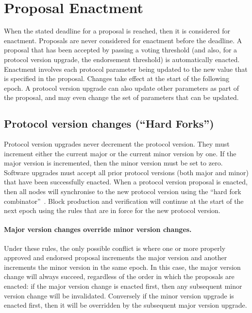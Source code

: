\newpage
\section{Proposal Enactment}
\label{sect:enactment}

When the stated deadline for a proposal is reached, then it is considered for enactment.  Proposals are never considered for enactment
before the deadline.  A proposal that has been accepted by passing a voting threshold (and also, for a protocol version upgrade, the
endorsement threshold) is automatically enacted.  Enactment involves each protocol parameter being updated to the new value that is specified
in the proposal.  Changes take effect at the start of the following epoch.  A protocol version upgrade can also update other parameters as part of
the proposal, and may even change the set of parameters that can be updated.

\subsection{Protocol version changes (``Hard Forks'')}

Protocol version upgrades never decrement the protocol version.  They must increment either the current major or the current minor version by one.
If the major version is incremented, then the minor version must be set to zero.
Software upgrades must accept all prior protocol versions (both major and minor) that have been successfully enacted.
When a protocol version proposal is enacted, then all nodes will synchronise to the new protocol version using the ``hard fork combinator''~\cite{hardfork-combinator}.
Block production and verification will continue at the start of the next epoch using the rules that are in force for the new protocol version.

\paragraph{Major version changes override minor version changes.}
Under these rules, the only possible conflict is where one or more properly approved and endorsed proposal increments the major version and another increments the
minor version in the same epoch.  In this case, the major version change will always succeed, regardless of the order in which the proposals are enacted: if the major version change is enacted first,
then any subsequent minor version change will be invalidated.  Conversely if the minor version upgrade is enacted first, then it will be overridden by the subsequent major version upgrade.

